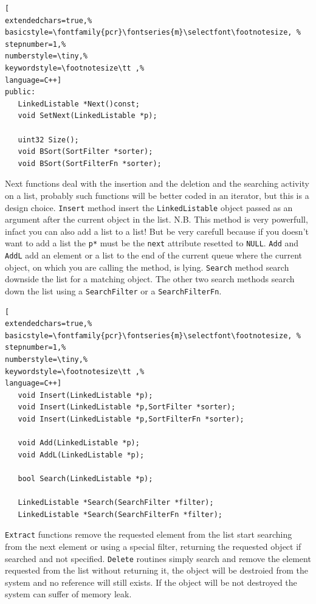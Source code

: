 \begin{lstlisting}[
extendedchars=true,%
basicstyle=\fontfamily{pcr}\fontseries{m}\selectfont\footnotesize, %
stepnumber=1,%
numberstyle=\tiny,%
keywordstyle=\footnotesize\tt ,%
language=C++]
public:
   LinkedListable *Next()const;
   void SetNext(LinkedListable *p);

   uint32 Size();
   void BSort(SortFilter *sorter);
   void BSort(SortFilterFn *sorter);
\end{lstlisting}


Next functions deal with the insertion and the deletion and the searching activity on a list, probably such functions will be better coded in an iterator, but this is a design choice. \texttt{Insert} method insert the \texttt{LinkedListable} object passed as an argument after the current object in the list. N.B. This method is very powerfull, infact you can also add a list to a list! But be very carefull because if you doesn't want to add a list the \texttt{p*} must be the \texttt{next} attribute resetted to \texttt{NULL}.
\texttt{Add} and \texttt{AddL} add an element or a list to the end of the current queue where the current object, on which you are calling the method, is lying. \texttt{Search} method search downside the list for a matching object. The other two search methods search down the list using a \texttt{SearchFilter} or a \texttt{SearchFilterFn}.

\begin{lstlisting}[
extendedchars=true,%
basicstyle=\fontfamily{pcr}\fontseries{m}\selectfont\footnotesize, %
stepnumber=1,%
numberstyle=\tiny,%
keywordstyle=\footnotesize\tt ,%
language=C++]
   void Insert(LinkedListable *p);
   void Insert(LinkedListable *p,SortFilter *sorter);
   void Insert(LinkedListable *p,SortFilterFn *sorter);

   void Add(LinkedListable *p);
   void AddL(LinkedListable *p);

   bool Search(LinkedListable *p);

   LinkedListable *Search(SearchFilter *filter);
   LinkedListable *Search(SearchFilterFn *filter);
\end{lstlisting}

\texttt{Extract} functions remove the requested element from the list start searching from the next element or using a special filter, returning the requested object if searched and not specified. \texttt{Delete} routines simply search and remove the element requested from the list without returning it, the object will be destroied from the system and no reference will still exists. If the object will be not destroyed the system can suffer of memory leak.

